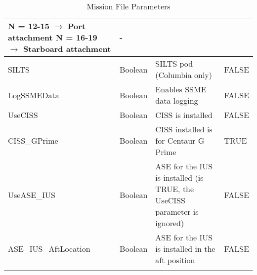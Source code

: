 \documentclass[Space_Shuttle_Ultra_Manual.tex]{subfiles}
\begin{document}
\begin{longtable}{|l|p{1.5cm}|p{7.5cm}|p{2.0cm}|}
N = 12-15 $\rightarrow$ Port attachment\newline
N = 16-19 $\rightarrow$ Starboard attachment & - \\
	\hline
	\rule{0pt}{2ex}
	SILTS & Boolean & SILTS pod (Columbia only) & FALSE\\
	\hline
	\rule{0pt}{2ex}
	LogSSMEData & Boolean & Enables SSME data logging & FALSE\\
	\hline
	\rule{0pt}{2ex}
	UseCISS & Boolean & CISS is installed & FALSE\\
	\hline
	\rule{0pt}{2ex}
	CISS\_GPrime & Boolean & CISS installed is for Centaur G Prime & TRUE\\
	\hline
	\rule{0pt}{2ex}
	UseASE\_IUS & Boolean & ASE for the IUS is installed (is TRUE, the UseCISS parameter is ignored) & FALSE\\
	\hline
	\rule{0pt}{2ex}
	ASE\_IUS\_AftLocation & Boolean & ASE for the IUS is installed in the aft position & FALSE\\
	\hline
	\caption{Mission File Parameters}
  \label{tab:Mission_File}
	\end{longtable}
\end{document}
